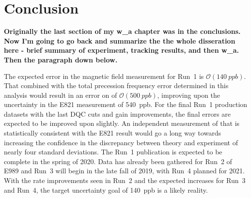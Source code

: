 
\thispagestyle{myheadings} %

\chapter{Conclusion}
\label{chapter:Conclusion}

\textbf{Originally the last section of my w\_a chapter was in the conclusions. Now I'm going to go back and summarize the the whole disseration here - brief summary of experiment, tracking results, and then w\_a. Then the paragraph down below.}



The expected error in the magnetic field measurement for Run~1 is $\mathcal{O}(\SI{140}{ppb})$. That combined with the total precession frequency error determined in this analysis would result in an error on \amu of $\mathcal{O}(\SI{500}{ppb})$, improving upon the uncertainty in the E821 measurement of \SI{540}{ppb}. For the final Run~1 production datasets with the last DQC cuts and gain improvements, the final errors are expected to be improved upon slightly. An independent measurement of \amu that is statistically consistent with the E821 result would go a long way towards increasing the confidence in the discrepancy between theory and experiment of nearly four standard deviations. The Run~1 publication is expected to be complete in the spring of 2020. Data has already been gathered for Run~2 of E989 and Run~3 will begin in the late fall of 2019, with Run~4 planned for 2021. With the rate improvements seen in Run~2 and the expected increases for Run~3 and Run~4, the target uncertainty goal of \SI{140}{ppb} is a likely reality.













